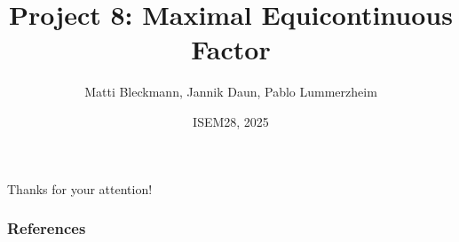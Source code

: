 \documentclass[aspectratio=169, handout]{beamer}
\title[Maximal Equicontinuous Factor]{Project 8: Maximal Equicontinuous Factor}
\author{Matti Bleckmann, Jannik Daun, Pablo Lummerzheim}
\institute{Coordinator: Lino Haupt}
\date{ISEM28, 2025}
\numberwithin{equation}{section}
\theoremstyle{plain}
\begin{document}
\setlength{\abovedisplayshortskip}{1pt}
\setlength{\belowdisplayshortskip}{1pt} 
\setlength{\abovedisplayskip}{1pt}
\setlength{\belowdisplayskip}{1pt}  %
\begingroup 
    \begin{frame}
        \titlepage
    \end{frame}
\endgroup








\section*{}
\begingroup 
\begin{frame}{}
    \begin{center}
\Large
    Thanks for your attention!
\end{center}
\end{frame}
  \begin{frame}
   \frametitle{References}
    \printbibliography[heading=none]
  \end{frame}
\endgroup
\end{document}
